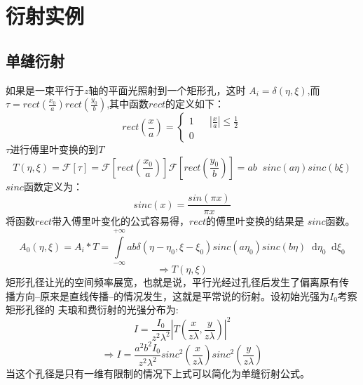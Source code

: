 \documentclass{article}
\newcommand*{\dif}{\mathop{}\!\mathrm{d}}
\begin{document}
\section{衍射实例}
\subsection{单缝衍射}
如果是一束平行于$z$轴的平面光照射到一个矩形孔，这时
$A_i=\delta(\eta,\xi)$,而
$\tau=rect(\frac{x_0}{a})rect(\frac{y_0}{b})$,其中函数$rect$的定义如下：
\[
  rect(\frac{x}{a})=\left \{
    \begin{array}{rcl}
      1 && |\frac{x}{a}|\leq \frac{1}{2}\\
      0 && {}
    \end{array}
  \right
  .
\]
$\tau$进行傅里叶变换的到$T$
\[T(\eta,\xi)=\mathscr{F}[\tau]=\mathscr{F}[rect(\frac{x_0}{a})]\mathscr{F}[rect(\frac{y_0}{b})]=ab\mathop{}\!sinc(a\eta)sinc(b\xi)\]
$sinc$函数定义为：
\[sinc(x)=\frac{sin(\pi x)}{\pi x}\]
将函数$rect$带入傅里叶变化的公式容易得，$rect$的傅里叶变换的结果是
$sinc$函数。
\[A_0(\eta,\xi)=A_i*T=\int\limits_{-\infty}^{+\infty}ab\delta(\eta-\eta_0,\xi-\xi_0)sinc(a\eta_0)sinc(b\eta)\dif\eta_0\dif\xi_0\]
\[\Rightarrow T(\eta,\xi)\]
矩形孔径让光的空间频率展宽，也就是说，平行光经过孔径后发生了偏离原有传
播方向--原来是直线传播--的情况发生，这就是平常说的衍射。设初始光强为$I_0$考察矩形孔径的
夫琅和费衍射的光强分布为:
\[I=\frac{I_0}{z^2\lambda^2}|T(\frac{x}{z\lambda},\frac{y}{z\lambda})|^2\]
\[\Rightarrow I=\frac{a^2b^2I_0}{z^2\lambda^2}sinc^2(\frac{x}{z\lambda})sinc^2(\frac{y}{z\lambda})\]
当这个孔径是只有一维有限制的情况下上式可以简化为单缝衍射公式。
\end{document}
